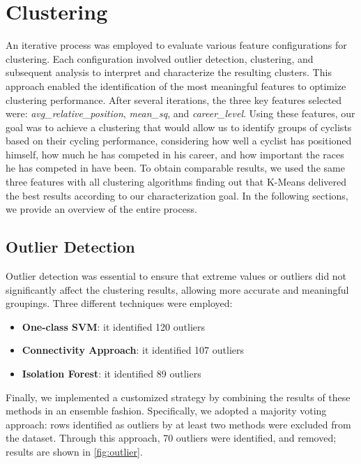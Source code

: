 \section{Clustering}
An iterative process was employed to evaluate various feature configurations for clustering. Each configuration involved outlier detection, clustering, and subsequent analysis to interpret and characterize the resulting clusters. This approach enabled the identification of the most meaningful features to optimize clustering performance.
After several iterations, the three key features selected were: \textit{avg\_relative\_position}, \textit{mean\_sq}, and \textit{career\_level}. Using these features, our goal was to achieve a clustering that would allow us to identify groups of cyclists based on their cycling performance, considering how well a cyclist has positioned himself, how much he has competed in his career, and how important the races he has competed in have been. 
To obtain comparable results, we used the same three features with all clustering algorithms finding out that K-Means delivered the best results according to our characterization goal.
In the following sections, we provide an overview of the entire process.

\subsection{Outlier Detection}
Outlier detection was essential to ensure that extreme values or outliers did not significantly affect the clustering results, allowing more accurate and meaningful groupings. Three different techniques were employed:
\begin{itemize}
    \vspace{-0.20cm}
    \item \textbf{One-class SVM}: it identified 120 outliers
    \vspace{-0.20cm}
    \item \textbf{Connectivity Approach}: it identified 107 outliers 
    \vspace{-0.20cm}
    \item \textbf{Isolation Forest}: it identified 89 outliers
\end{itemize}
\vspace{-0.20cm}

\noindent
Finally, we implemented a customized strategy by combining the results of these methods in an ensemble fashion. Specifically, we adopted a majority voting approach: rows identified as outliers by at least two methods were excluded from the dataset. Through this approach, 70 outliers were identified, and removed; results are shown in \autoref{fig:outlier}.


